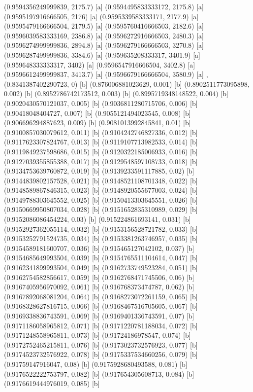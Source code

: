 {{{(0.9594356249999839, 2175.7) [a] 
(0.9594495833333172, 2175.8) [a] 
(0.9595197916666505, 2176) [a] 
(0.9595339583333171, 2177.9) [a] 
(0.9595479166666504, 2179.5) [a] 
(0.9595760416666503, 2182.6) [a] 
(0.9596039583333169, 2386.8) [a] 
(0.9596272916666503, 2480.3) [a] 
(0.9596274999999836, 2894.8) [a] 
(0.9596279166666503, 3270.8) [a] 
(0.9596287499999836, 3384.6) [a] 
(0.959635208333317, 3401.9) [a] 
(0.959648333333317, 3402) [a] 
(0.9596547916666504, 3402.8) [a] 
(0.9596612499999837, 3413.7) [a] 
(0.9596679166666504, 3580.9) [a] 
},{(0.8341387402290723, 0) [b] 
(0.876006881023629, 0.001) [b] 
(0.8902511773095898, 0.002) [b] 
(0.8952786742173512, 0.003) [b] 
(0.8995719348148522, 0.004) [b] 
(0.9020430570121037, 0.005) [b] 
(0.9036811280715706, 0.006) [b] 
(0.90418048404727, 0.007) [b] 
(0.9055121494023545, 0.008) [b] 
(0.906696294887623, 0.009) [b] 
(0.9081013992845841, 0.01) [b] 
(0.9100857030079612, 0.011) [b] 
(0.9104242746827336, 0.012) [b] 
(0.9117623307824767, 0.013) [b] 
(0.9119107713982533, 0.014) [b] 
(0.9119849237598686, 0.015) [b] 
(0.9120322185006933, 0.016) [b] 
(0.9127039355855388, 0.017) [b] 
(0.9129548597108733, 0.018) [b] 
(0.9134753639760872, 0.019) [b] 
(0.9139233591117885, 0.02) [b] 
(0.9144839802157528, 0.021) [b] 
(0.9148521108701348, 0.022) [b] 
(0.9148589867846315, 0.023) [b] 
(0.9148920555677003, 0.024) [b] 
(0.9149788303645552, 0.025) [b] 
(0.9150413303645551, 0.026) [b] 
(0.9150669950807034, 0.028) [b] 
(0.9151652835310989, 0.029) [b] 
(0.9152086086454224, 0.03) [b] 
(0.915224861693141, 0.031) [b] 
(0.9152927362055114, 0.032) [b] 
(0.9153156528721782, 0.033) [b] 
(0.9153252791524735, 0.034) [b] 
(0.9153381263746957, 0.035) [b] 
(0.9154589181600707, 0.036) [b] 
(0.915465127042102, 0.037) [b] 
(0.9154685649993504, 0.039) [b] 
(0.9154765511104614, 0.047) [b] 
(0.9162341899993504, 0.049) [b] 
(0.9162733749523284, 0.051) [b] 
(0.9162754582856617, 0.059) [b] 
(0.9162768471745506, 0.06) [b] 
(0.9167405956970092, 0.061) [b] 
(0.916768373474787, 0.062) [b] 
(0.9167892068081204, 0.064) [b] 
(0.9168273072261159, 0.065) [b] 
(0.9168328627816715, 0.066) [b] 
(0.9168467516705605, 0.067) [b] 
(0.9169338836743591, 0.069) [b] 
(0.9169401336743591, 0.07) [b] 
(0.9171186058965812, 0.071) [b] 
(0.9171220781188034, 0.072) [b] 
(0.9171248558965811, 0.073) [b] 
(0.91724186978547, 0.074) [b] 
(0.9172752465215811, 0.076) [b] 
(0.9173023732576923, 0.077) [b] 
(0.9174523732576922, 0.078) [b] 
(0.9175337534660256, 0.079) [b] 
(0.91759147916047, 0.08) [b] 
(0.9175928680493588, 0.081) [b] 
(0.9176522222753797, 0.082) [b] 
(0.917654305608713, 0.084) [b] 
(0.9176619444976019, 0.085) [b] 
}}}
